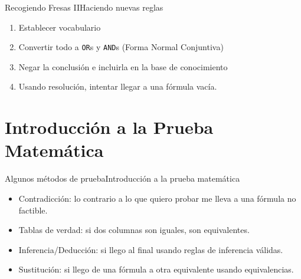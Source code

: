 \documentclass[spanish, c]{beamer}
\begin{document}
\begin{frame}{Recogiendo Fresas II}{Haciendo nuevas reglas}

    \begin{enumerate}
        \item Establecer vocabulario
        \item Convertir todo a \texttt{OR}s y \texttt{AND}s (\alert{Forma Normal Conjuntiva})
        \item Negar la conclusión e incluirla en la base de conocimiento
        \item Usando resolución, intentar llegar a una fórmula vacía.
    \end{enumerate}
    
\end{frame}

\section{Introducción a la Prueba Matemática}

\begin{frame}{Algunos métodos de prueba}{Introducción a la prueba matemática}

    \begin{itemize}
        \itemsep2.5ex
        \item Contradicción: lo contrario a lo que quiero probar me lleva a una fórmula no factible.
        \item Tablas de verdad: si dos columnas son iguales, son equivalentes.
        \item Inferencia/Deducción: si llego al final usando reglas de inferencia válidas.
        \item Sustitución: si llego de una fórmula a otra equivalente usando equivalencias.
    \end{itemize}

\end{frame}




\end{document}

